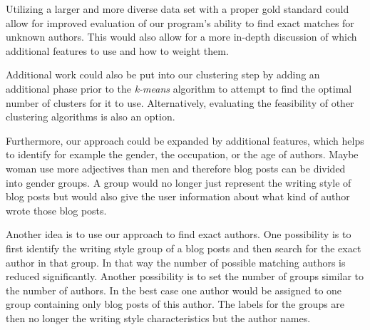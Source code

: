 Utilizing a larger and more diverse data set with a proper gold standard could allow for improved evaluation of our program’s ability to find exact matches for unknown authors.
This would also allow for a more in-depth discussion of which additional features to use and how to weight them.


Additional work could also be put into our clustering step by adding an additional phase prior to the \textit{k-means} algorithm to attempt to find the optimal number of clusters for it to use.
Alternatively, evaluating the feasibility of other clustering algorithms is also an option.


Furthermore, our approach could be expanded by additional features, which helps to identify for example the gender, the occupation, or the age of authors.
Maybe woman use more adjectives than men and therefore blog posts can be divided into gender groups.
A group would no longer just represent the writing style of blog posts but would also give the user information about what kind of author wrote those blog posts.


Another idea is to use our approach to find exact authors.
One possibility is to first identify the writing style group of a blog posts and then search for the exact author in that group.
In that way the number of possible matching authors is reduced significantly.
Another possibility is to set the number of groups similar to the number of authors.
In the best case one author would be assigned to one group containing only blog posts of this author.
The labels for the groups are then no longer the writing style characteristics but the author names.
